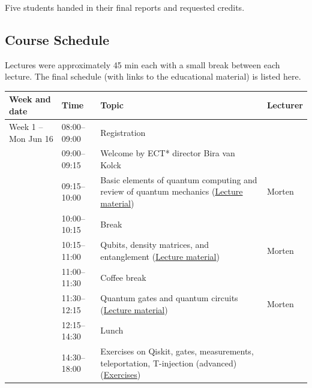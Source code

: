 \documentclass[prc,amsart,english]{revtex4-2}
\begin{document}
Five students handed in their final reports and requested credits. 
  

\subsection{Course Schedule}
  
Lectures were approximately 45 min each with a small break between each lecture. 
The final schedule (with links to the educational material) is listed here.
\begin{table}[hbtp]
{\footnotesize
\begin{tabular}{l l l l}\hline
\textbf{Week and date} & \textbf{Time} & \textbf{Topic} & \textbf{Lecturer}\\
\hline

Week 1 -- Mon Jun 16 & 08:00--09:00 & Registration &  \\
& 09:00--09:15 & Welcome by ECT* director Bira van Kolck &  \\
& 09:15--10:00 & Basic elements of quantum computing and review of quantum mechanics (\href{https://github.com/NuclearTalent/TalentQuantumComputingECT2025/blob/main/doc/pub/MondayJune16/Firstlecture.ipynb}{Lecture material}) & Morten \\
& 10:00--10:15 & Break &  \\
& 10:15--11:00 & Qubits, density matrices, and entanglement (\href{https://github.com/NuclearTalent/TalentQuantumComputingECT2025/blob/main/doc/pub/MondayJune16/Secondlecture.ipynb}{Lecture material}) & Morten \\
& 11:00--11:30 & Coffee break &  \\
& 11:30--12:15 & Quantum gates and quantum circuits (\href{https://github.com/NuclearTalent/TalentQuantumComputingECT2025/blob/main/doc/pub/MondayJune16/Thirdlecture.ipynb}{Lecture material}) & Morten \\
& 12:15--14:30 & Lunch &  \\
& 14:30--18:00 & Exercises on Qiskit, gates, measurements, teleportation, T-injection (advanced) (\href{https://github.com/NuclearTalent/TalentQuantumComputingECT2025/blob/main/doc/pub/Exercises}{Exercises}) &  \\


\end{tabular}}
\end{table}
\end{document}
